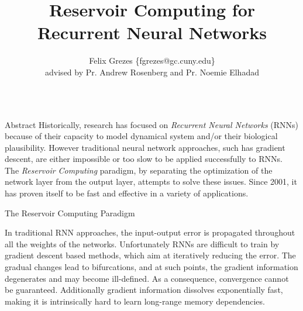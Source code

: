 \documentclass[final]{beamer}
\title[Fancy Posters]{Reservoir Computing for Recurrent Neural Networks}
\author[Grezes \& Rosenberg]{Felix Grezes \{fgrezes@gc.cuny.edu\}\\
\vspace{5 mm}
advised by Pr. Andrew Rosenberg and Pr. Noemie Elhadad}
\institute[SLQC CUNY]{The Speech Lab at Queens College CUNY}
\begin{document}
\begin{columns}[t]
\begin{column}{.45\linewidth}

\bigskip

\begin{block}{\vspace{-9 mm} \LARGE Abstract}
\large
Historically, research has focused on {\em Recurrent Neural Networks} (RNNs)  because of their capacity to model dynamical system and/or their biological plausibility. However traditional neural network approaches, such has gradient descent, are either impossible or too slow to be applied successfully to RNNs.\\
The {\em Reservoir Computing} paradigm, by separating the optimization of the network layer from the output layer, attempts to solve these issues. Since 2001, it has proven itself to be fast and effective in a variety of applications.
\end{block}

\bigskip 

\begin{block}{\vspace{-13 mm} \LARGE The Reservoir Computing Paradigm}
\begin{figure}[t]
\end{figure}
\large In traditional RNN approaches, the input-output error is propagated throughout all the weights of the networks. Unfortunately RNNs are difficult to train by gradient descent based methods, which aim at iteratively reducing the error. The gradual changes lead to bifurcations, and at such points, the gradient information degenerates and may become ill-defined. As a consequence, convergence cannot be guaranteed. Additionally gradient information dissolves exponentially fast, making it is intrinsically hard to learn long-range memory dependencies.
\bigskip \bigskip


\end{block}
\end{column}
\end{columns}
\end{document}
